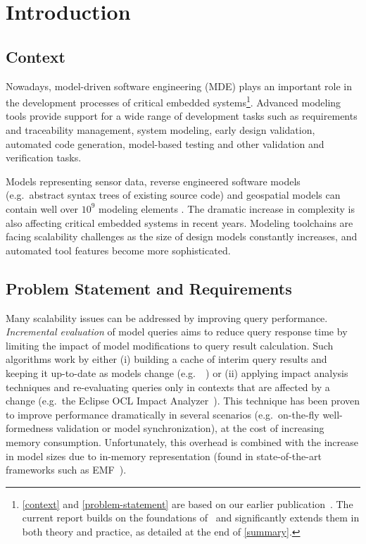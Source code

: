 \chapter{Introduction}
\label{chap:introduction}


\section{Context}
\label{context}

Nowadays, model-driven software engineering (MDE) plays an important role in the development processes of critical embedded systems\footnote{\autoref{context} and \autoref{problem-statement} are based on our earlier publication~\cite{Izso:2013:IIG:2487766.2487772}. The current report builds on the foundations of~\cite{Izso:2013:IIG:2487766.2487772} and significantly extends them in both theory and practice, as detailed at the end of \autoref{summary}.}. Advanced modeling tools provide support for a wide range of development tasks such as requirements and traceability management, system modeling, early design validation, automated code generation, model-based testing and other validation and verification tasks. 

Models representing sensor data, reverse engineered software models (e.g.\ abstract syntax trees of existing source code) and geospatial models can contain well over $10^9$ modeling elements \cite{Scheidgen12}. The dramatic increase in complexity is also affecting critical embedded systems in recent years. Modeling toolchains are facing scalability challenges as the size of design models constantly increases, and automated tool features become more sophisticated.

\section{Problem Statement and Requirements}
\label{problem-statement}

Many scalability issues can be addressed by improving query performance. \emph{Incremental evaluation} of model queries aims to reduce query response time by limiting the impact of model modifications to query result calculation. Such algorithms work by either (i) building a cache of interim query results and keeping it up-to-date as models change (e.g.\ \eiq{}~\cite{models10}) or (ii) applying impact analysis techniques and re-evaluating queries only in contexts that are affected by a change (e.g.\ the Eclipse OCL Impact Analyzer~\cite{OCLIA}). This technique has been proven to improve performance dramatically in several scenarios (e.g.\ on-the-fly well-formedness validation or model synchronization), at the cost of increasing memory consumption. Unfortunately, this overhead is combined with the increase in model sizes due to in-memory representation (found in state-of-the-art frameworks such as EMF~\cite{EMF}).


